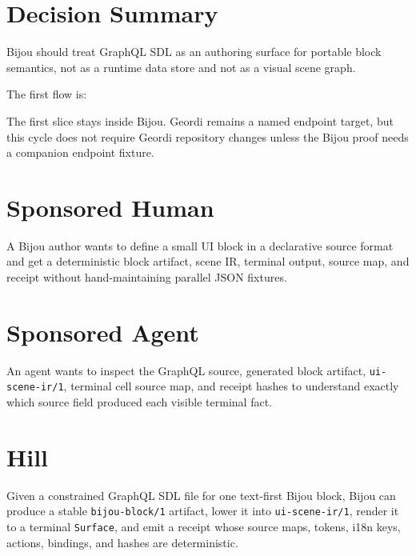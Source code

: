 \section{Decision Summary}\label{record-140-decision-summary}

Bijou should treat GraphQL SDL as an authoring surface for portable block semantics, not as a runtime data store and not as a visual scene graph.

The first flow is:



The first slice stays inside Bijou. Geordi remains a named endpoint target, but this cycle does not require Geordi repository changes unless the Bijou proof needs a companion endpoint fixture.

\section{Sponsored Human}\label{record-140-sponsored-human}

A Bijou author wants to define a small UI block in a declarative source format and get a deterministic block artifact, scene IR, terminal output, source map, and receipt without hand-maintaining parallel JSON fixtures.

\section{Sponsored Agent}\label{record-140-sponsored-agent}

An agent wants to inspect the GraphQL source, generated block artifact, \texttt{u\allowbreak{}i\allowbreak{}-\allowbreak{}s\allowbreak{}c\allowbreak{}e\allowbreak{}n\allowbreak{}e\allowbreak{}-\allowbreak{}i\allowbreak{}r\allowbreak{}/\allowbreak{}1}, terminal cell source map, and receipt hashes to understand exactly which source field produced each visible terminal fact.

\section{Hill}\label{record-140-hill}

Given a constrained GraphQL SDL file for one text-first Bijou block, Bijou can produce a stable \texttt{b\allowbreak{}i\allowbreak{}j\allowbreak{}o\allowbreak{}u\allowbreak{}-\allowbreak{}b\allowbreak{}l\allowbreak{}o\allowbreak{}c\allowbreak{}k\allowbreak{}/\allowbreak{}1} artifact, lower it into \texttt{u\allowbreak{}i\allowbreak{}-\allowbreak{}s\allowbreak{}c\allowbreak{}e\allowbreak{}n\allowbreak{}e\allowbreak{}-\allowbreak{}i\allowbreak{}r\allowbreak{}/\allowbreak{}1}, render it to a terminal \texttt{S\allowbreak{}u\allowbreak{}r\allowbreak{}f\allowbreak{}a\allowbreak{}c\allowbreak{}e}, and emit a receipt whose source maps, tokens, i18n keys, actions, bindings, and hashes are deterministic.

